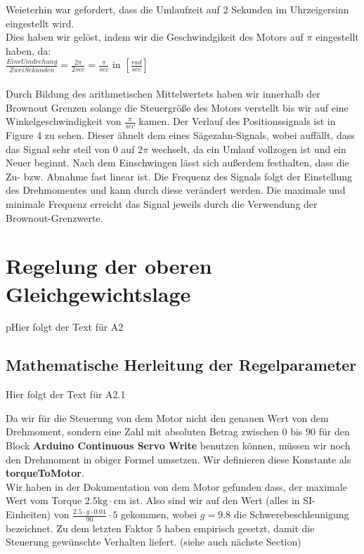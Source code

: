 \documentclass{article}
\begin{document}
\vspace{5mm}
Weieterhin war gefordert, dass die Umlaufzeit auf 2 Sekunden im Uhrzeigersinn eingestellt wird.\\Dies haben wir gelöst, indem wir die Geschwindgikeit des Motors auf $\pi$ eingestellt haben, da:\\
$\frac{Eine Umdrehung}{Zwei Sekunden} = \frac{2\pi}{2sec} = \frac{\pi}{sec}$ in $[\frac{rad}{sec}]$\\
\\Durch Bildung des arithmetischen Mittelwertets haben wir innerhalb der Brownout Grenzen solange die Steuergröße des Motors verstellt bis wir auf eine Winkelgeschwindigkeit von $\frac{\pi}{sec}$ kamen.
Der Verlauf des Positionssignals ist in Figure 4 zu sehen. Dieser ähnelt dem eines Sägezahn-Signals, wobei auffällt, dass das Signal sehr steil von 0 auf $2\pi$ wechselt, da ein Umlauf vollzogen ist und ein Neuer beginnt.
Nach dem Einschwingen lässt sich außerdem festhalten, dass die Zu- bzw. Abnahme fast linear ist.
Die Frequenz des Signals folgt der Einstellung des Drehmomentes und kann durch diese verändert werden. Die maximale und minimale Frequenz erreicht das Signal jeweils durch die Verwendung der Brownout-Grenzwerte.


\newpage


\section{Regelung der oberen Gleichgewichtslage}
pHier folgt der Text für A2

\subsection{Mathematische Herleitung der Regelparameter}\label{section:mathsDerive}
Hier folgt der Text für A2.1

Da wir für die Steuerung von dem Motor nicht den genauen Wert von dem Drehmoment, sondern
eine Zahl mit absoluten Betrag zwischen $0$ bis $90$ für den Block \textbf{Arduino Continuous Servo Write} benutzen 
können, müssen wir noch den Drehmoment in obiger Formel umsetzen. Wir definieren diese Konstante als \textbf{torqueToMotor}.\\
Wir haben in der Dokumentation von dem Motor gefunden dass, der maximale Wert vom Torque $2.5 \text{kg} \cdot \text{cm}$ ist. Also sind wir auf
den Wert (alles in SI-Einheiten) von $\frac{2.5 \cdot g \cdot 0.01}{90} \cdot 5 $ gekommen, wobei $g = 9.8$ die Schwerebeschleunigung bezeichnet.
Zu dem letzten Faktor $5$ haben empirisch gesetzt, damit die Steuerung gewünschte Verhalten liefert. (siehe auch nächste Section)
\end{document}
